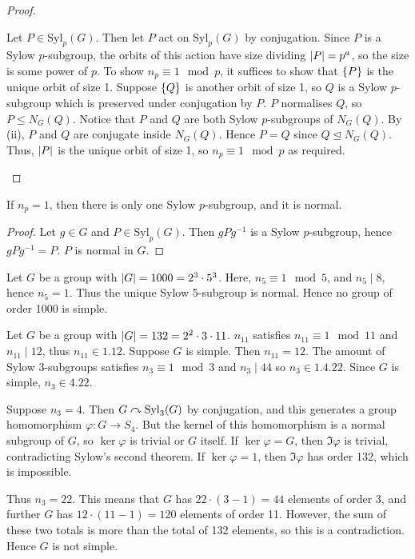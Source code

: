 \begin{proof}
\begin{enumerate}
		      Let \( P \in \mathrm{Syl}_p(G) \).
		      Then let \( P \) act on \( \mathrm{Syl}_p(G) \) by conjugation.
		      Since \( P \) is a Sylow \( p \)-subgroup, the orbits of this action have size dividing \( \abs{P} = p^a \), so the size is some power of \( p \).
		      To show \( n_p \equiv 1 \mod p \), it suffices to show that \( \qty{P} \) is the unique orbit of size 1.
		      Suppose \( \qty{Q} \) is another orbit of size 1, so \( Q \) is a Sylow \( p \)-subgroup which is preserved under conjugation by \( P \).
		      \( P \) normalises \( Q \), so \( P \leq N_G(Q) \).
		      Notice that \( P \) and \( Q \) are both Sylow \( p \)-subgroups of \( N_G(Q) \).
		      By (ii), \( P \) and \( Q \) are conjugate inside \( N_G(Q) \).
		      Hence \( P = Q \) since \( Q \trianglelefteq N_G(Q) \).
		      Thus, \( \abs{P} \) is the unique orbit of size 1, so \( n_p \equiv 1 \mod p \) as required.
	\end{enumerate}
\end{proof}
\begin{corollary}
	If \( n_p = 1 \), then there is only one Sylow \( p \)-subgroup, and it is normal.
\end{corollary}
\begin{proof}
	Let \( g \in G \) and \( P \in \mathrm{Syl}_p(G) \).
	Then \( g P g^{-1} \) is a Sylow \( p \)-subgroup, hence \( g P g^{-1} = P \).
	\( P \) is normal in \( G \).
\end{proof}
\begin{example}
	Let \( G \) be a group with \( \abs{G} = 1000 = 2^3 \cdot 5^3 \).
	Here, \( n_5 \equiv 1 \mod 5 \), and \( n_5 \mid 8 \), hence \( n_5 = 1 \).
	Thus the unique Sylow 5-subgroup is normal.
	Hence no group of order 1000 is simple.
\end{example}
\begin{example}
	Let \( G \) be a group with \( \abs{G} = 132 = 2^2 \cdot 3 \cdot 11 \).
	\( n_{11} \) satisfies \( n_{11} \equiv 1 \mod 11 \) and \( n_{11} \mid 12 \), thus \( n_{11} \in \qty{1, 12} \).
	Suppose \( G \) is simple.
	Then \( n_{11} = 12 \).
	The amount of Sylow 3-subgroups satisfies \( n_3 \equiv 1 \mod 3 \) and \( n_3 \mid 44 \) so \( n_3 \in \qty{1, 4, 22} \).
	Since \( G \) is simple, \( n_3 \in \qty{4, 22} \).

	Suppose \( n_3 = 4 \).
	Then \( G \curvearrowright \mathrm{Syl}_3(G) \) by conjugation, and this generates a group homomorphism \( \varphi \colon G \to S_4 \).
	But the kernel of this homomorphism is a normal subgroup of \( G \), so \( \ker \varphi \) is trivial or \( G \) itself.
	If \( \ker \varphi = G \), then \( \Im \varphi \) is trivial, contradicting Sylow's second theorem.
	If \( \ker \varphi = 1 \), then \( \Im \varphi \) has order 132, which is impossible.

	Thus \( n_3 = 22 \).
	This means that \( G \) has \( 22 \cdot (3-1) = 44 \) elements of order 3, and further \( G \) has \( 12 \cdot (11 - 1) = 120 \) elements of order 11.
	However, the sum of these two totals is more than the total of 132 elements, so this is a contradiction.
	Hence \( G \) is not simple.
\end{example}

